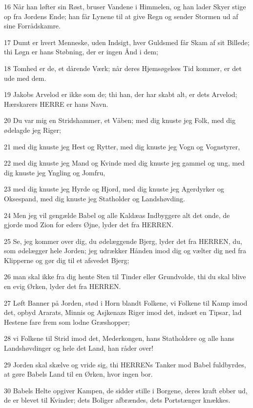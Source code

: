\par 16 Når han løfter sin Røst, bruser Vandene i Himmelen, og han lader Skyer stige op fra Jordens Ende; han får Lynene til at give Regn og sender Stormen ud af sine Forrådskamre.
\par 17 Dumt er hvert Menneske, uden Indsigt, hver Guldsmed får Skam af sit Billede; thi Løgn er hans Støbning, der er ingen Ånd i dem;
\par 18 Tomhed er de, et dårende Værk; når deres Hjemsøgelses Tid kommer, er det ude med dem.
\par 19 Jakobs Arvelod er ikke som de; thi han, der har skabt alt, er dets Arvelod; Hærskarers HERRE er hans Navn.
\par 20 Du var mig en Stridshammer, et Våben; med dig knuste jeg Folk, med dig ødelagde jeg Riger;
\par 21 med dig knuste jeg Hest og Rytter, med dig knuste jeg Vogn og Vognstyrer,
\par 22 med dig knuste jeg Mand og Kvinde med dig knuste jeg gammel og ung, med dig knuste jeg Yngling og Jomfru,
\par 23 med dig knuste jeg Hyrde og Hjord, med dig knuste jeg Agerdyrker og Oksespand, med dig knuste jeg Statholder og Landshøvding.
\par 24 Men jeg vil gengælde Babel og alle Kaldæas Indbyggere alt det onde, de gjorde mod Zion for eders Øjne, lyder det fra HERREN.
\par 25 Se, jeg kommer over dig, du ødelæggende Bjerg, lyder det fra HERREN, du, som ødelægger hele Jorden; jeg udrækker Hånden imod dig og vælter dig ned fra Klipperne og gør dig til et afsvedet Bjerg;
\par 26 man skal ikke fra dig hente Sten til Tinder eller Grundvolde, thi du skal blive en evig Ørken, lyder det fra HERREN.
\par 27 Løft Banner på Jorden, stød i Horn blandt Folkene, vi Folkene til Kamp imod det, opbyd Ararats, Minnis og Asjkenazs Riger imod det, indsæt en Tipsar, lad Hestene fare frem som lodne Græshopper;
\par 28 vi Folkene til Strid imod det, Mederkongen, hans Statholdere og alle hans Landshøvdinger og hele det Land, han råder over!
\par 29 Jorden skal skælve og vride sig, thi HERRENs Tanker mod Babel fuldbyrdes, at gøre Babels Land til en Ørken, hvor ingen bor.
\par 30 Babels Helte opgiver Kampen, de sidder stille i Borgene, deres kraft ebber ud, de er blevet til Kvinder; dets Boliger afbrændes, dets Portstænger knækkes.
